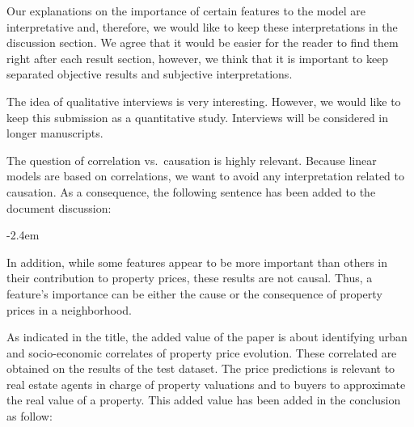 \documentclass[]{article}
\renewenvironment{quote}{\begin{fquote}\advance\leftmargini -2.4em\begin{oldquote}}{\end{oldquote}\end{fquote}}
\newenvironment{fquote}
  {\def\FrameCommand{
	\fboxsep=0.6em %
	\fcolorbox{black}{white}}%
    \MakeFramed {\advance\hsize-2\width \FrameRestore}
    \begin{minipage}{\linewidth}
  }
  {\end{minipage}\endMakeFramed}
\begin{document}
Our explanations on the importance of certain features to the model are interpretative and, therefore, we would like to keep these interpretations in the discussion section. We agree that it would be easier for the reader to find them right after each result section, however, we think that it is important to keep separated objective results and subjective interpretations.

The idea of qualitative interviews is very interesting. However, we would like to keep this submission as a quantitative study. Interviews will be considered in longer manuscripts.


The question of correlation vs.~causation is highly relevant. Because linear models are based on correlations, we want to avoid any interpretation related to causation. As a consequence, the following sentence has been added to the document discussion:

\begin{quote}
In addition, while some features appear to be more important than others in their contribution to property prices, these results are not causal. Thus, a feature's importance can be either the cause or the consequence of property prices in a neighborhood.
\end{quote}


As indicated in the title, the added value of the paper is about identifying urban and socio-economic correlates of property price evolution. These correlated are obtained on the results of the test dataset. The price predictions is relevant to real estate agents in charge of property valuations and to buyers to approximate the real value of a property. This added value has been added in the conclusion as follow:
\end{document}
